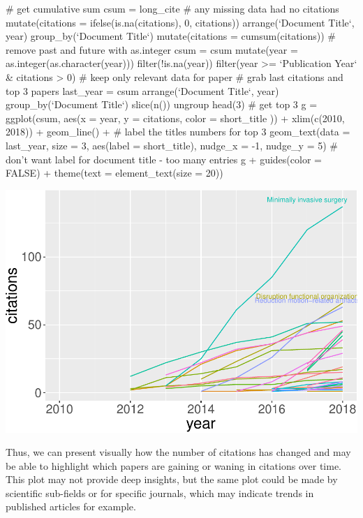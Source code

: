 \begin{Schunk}
\begin{Sinput}
# get cumulative sum
csum = long_cite %
  # any missing data had no citations
  mutate(citations = ifelse(is.na(citations), 0, citations)) %
  arrange(`Document Title`, year) %
  group_by(`Document Title`) %
  mutate(citations = cumsum(citations))
# remove past and future with as.integer
csum = csum %
  mutate(year = as.integer(as.character(year))) %
  filter(!is.na(year)) %
  filter(year >= `Publication Year` & citations > 0) # keep only relevant data for paper
# grab last citations and top 3 papers
last_year = csum %
  arrange(`Document Title`, year) %
  group_by(`Document Title`) %
  slice(n()) %
  ungroup %
  head(3)  # get top 3
g = ggplot(csum, 
           aes(x = year, y = citations, color = short_title  )) +
  xlim(c(2010, 2018)) + geom_line() + 
  # label the titles numbers for top 3
  geom_text(data = last_year, size = 3, aes(label = short_title), 
            nudge_x = -1, nudge_y = 5)
# don't want label for document title - too many entries
g + guides(color = FALSE) + theme(text = element_text(size = 20))
\end{Sinput}

\includegraphics{muschelli_files/figure-latex/unnamed-chunk-28-1} \end{Schunk}

Thus, we can present visually how the number of citations has changed
and may be able to highlight which papers are gaining or waning in
citations over time. This plot may not provide deep insights, but the
same plot could be made by scientific sub-fields or for specific
journals, which may indicate trends in published articles for example.

